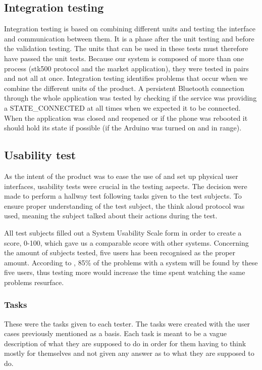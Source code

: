 		\subsection{Integration testing}
			Integration testing is based on combining different units and testing the interface and communication between them. It is a phase after the unit testing and before the validation testing. The units that can be used in these tests must therefore have passed the unit tests. Because our system is composed of more than one process (stk500 protocol and the market application), they were tested in pairs and not all at once. Integration testing identifies problems that occur when we combine the different units of the product. A persistent Bluetooth connection through the whole application was tested by checking if the service was providing a STATE\_CONNECTED at all times when we expected it to be connected. When the application was closed and reopened or if the phone was rebooted it should hold its state if possible (if the Arduino was turned on and in range). 


		\subsection{Usability test}
		As the intent of the product was to ease the use of and set up physical user interfaces, usability tests were crucial in the testing aspects. The decision were made to perform a hallway test following tasks given to the test subjects. To ensure proper understanding of the test subject, the think aloud protocol was used, meaning the subject talked about their actions during the test. 

		All test subjects filled out a System Usability Scale form in order to create a score, 0-100, which gave us a comparable score with other systems. Concerning the amount of subjects tested, five users has been recognised as the proper amount. According to \cite{Nielsen}, 85\% of the problems with a system will be found by these five users, thus testing more would increase the time spent watching the same problems resurface.

		\subsubsection{Tasks}
		These were the tasks given to each tester. The tasks were created with the user cases previously mentioned as a basis. Each task is meant to be a vague description of what they are supposed to do in order for them having to think mostly for themselves and not given any answer as to what they are supposed to do. 

